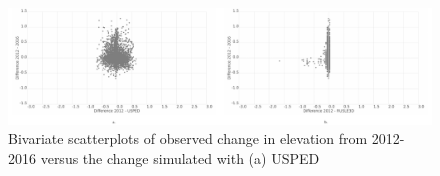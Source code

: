 \documentclass[gmd, manuscript]{copernicus}
\providecommand{\DIFadd}[1]{{\protect\color{blue} \sf #1}} %
\providecommand{\DIFdel}[1]{{\protect\color{red} [..\footnote{removed: #1} ]}} %
\providecommand{\DIFdelbegin}{} %
\providecommand{\DIFaddFL}[1]{\DIFadd{#1}} %
\providecommand{\DIFdelFL}[1]{\DIFdel{#1}} %
\providecommand{\DIFaddbeginFL}{} %
\providecommand{\DIFaddendFL}{} %
\providecommand{\DIFdelbeginFL}{} %
\providecommand{\DIFdelendFL}{} %
\begin{document}
\DIFdelbegin %
\DIFdelendFL %
\DIFaddbeginFL \begin{figure}
\center
\includegraphics[width=\textwidth,height=0.925\textheight,keepaspectratio]{figures/scatterplots.pdf}
\DIFaddendFL \caption{
\DIFaddbeginFL \DIFaddFL{Bivariate scatterplots of observed change in elevation from 2012-2016
versus the change simulated with 
(a) }\DIFaddendFL USPED \DIFdelbeginFL %
}
\end{figure}
\end{document}

